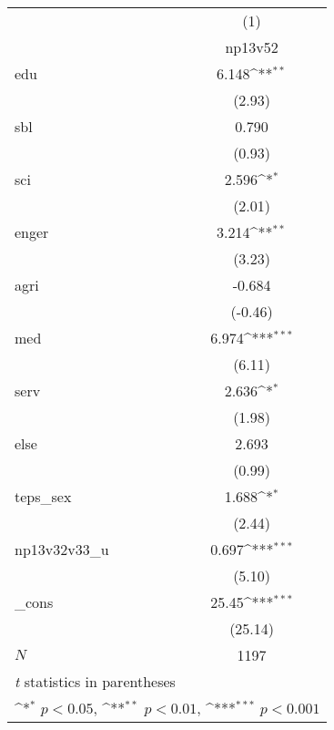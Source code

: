 {
\def\sym#1{\ifmmode^{#1}\else\(^{#1}\)\fi}
\begin{tabular}{l*{1}{c}}
\hline\hline
            &\multicolumn{1}{c}{(1)}\\
            &\multicolumn{1}{c}{np13v52}\\
\hline
edu         &       6.148\sym{**} \\
            &      (2.93)         \\
[1em]
sbl         &       0.790         \\
            &      (0.93)         \\
[1em]
sci         &       2.596\sym{*}  \\
            &      (2.01)         \\
[1em]
enger       &       3.214\sym{**} \\
            &      (3.23)         \\
[1em]
agri        &      -0.684         \\
            &     (-0.46)         \\
[1em]
med         &       6.974\sym{***}\\
            &      (6.11)         \\
[1em]
serv        &       2.636\sym{*}  \\
            &      (1.98)         \\
[1em]
else        &       2.693         \\
            &      (0.99)         \\
[1em]
teps\_sex    &       1.688\sym{*}  \\
            &      (2.44)         \\
[1em]
np13v32v33\_u&       0.697\sym{***}\\
            &      (5.10)         \\
[1em]
\_cons      &       25.45\sym{***}\\
            &     (25.14)         \\
\hline
\(N\)       &        1197         \\
\hline\hline
\multicolumn{2}{l}{\footnotesize \textit{t} statistics in parentheses}\\
\multicolumn{2}{l}{\footnotesize \sym{*} \(p<0.05\), \sym{**} \(p<0.01\), \sym{***} \(p<0.001\)}\\
\end{tabular}
}
